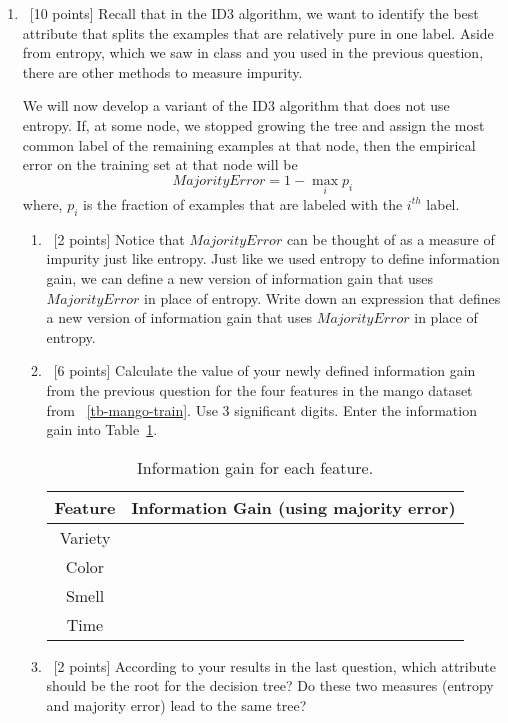 \begin{enumerate}
\item~[10 points] Recall that in the ID3 algorithm, we want to identify the best attribute that splits the examples that are relatively pure in one label.
  Aside from entropy, which we saw in class and you used in the previous question, there are other methods to measure impurity.

  We will now develop a variant of the ID3 algorithm that does not use entropy. If, at some node, we stopped growing the tree and assign the most common label of the remaining examples at that node, then the empirical error on the training set at that node will be
  $$MajorityError = 1 - \max_{i}p_i$$
  where, $p_i$ is the fraction of examples that are labeled with the $i^{th}$ label.



  

  \begin{enumerate}
  \item~[2 points]   Notice that $MajorityError$ can be thought of as a measure of impurity just like entropy. Just like we used entropy to define information gain, we can define a new version of information gain that uses $MajorityError$ in place of entropy. Write down an expression that defines a new version of information gain that uses $MajorityError$ in place of entropy.
    
  \item~[6 points] Calculate the value of your newly defined information gain from the previous question for the four features in the mango dataset from ~\ref{tb-mango-train}. Use 3 significant digits. Enter the information gain into Table~\ref{tb-maj-ig}.
    
    \begin{table}[h!]
      \centering
      \begin{tabular}{c|c}
        \hline
        Feature & Information Gain (using majority error) \\ \hline
        Variety &                  \\
        Color   &                  \\
        Smell   &                  \\
        Time    &                  \\ \hline
      \end{tabular}
      \caption{Information gain for each feature.}\label{tb-maj-ig}
    \end{table}

  \item~[2 points] According to your results in the last question, which
    attribute should be the root for the decision tree?  Do these two measures
    (entropy and majority error) lead to the same tree?
  \end{enumerate}

\end{enumerate}



